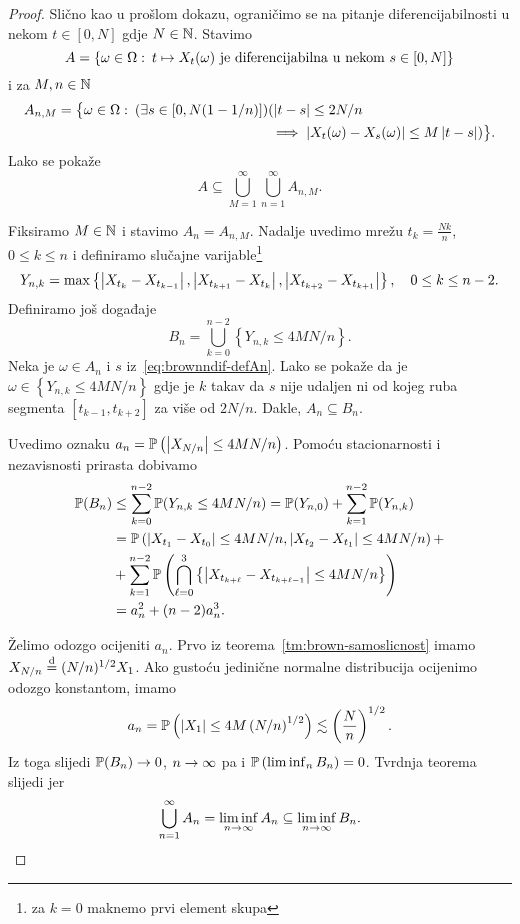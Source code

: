 \documentclass[main.tex]{subfiles}
\begin{document}
\begin{proof}
	Slično kao u prošlom dokazu, ograničimo se na pitanje diferencijabilnosti u nekom
	\( t \in \left[ 0, N \right] \) gdje \( N \in \N \). Stavimo
	\[ A = \left\{ \omega \in \Omega \st t \mapsto X_t(\omega)\mathrm{\ je \ diferencijabilna \ u\ nekom \  } s \in \left[ 0, N \right] \right\}  \]
	i za \( M, n \in \N \)
	\begin{equation} \label{eq:brownndif-defAn}
		\begin{aligned}
			A_{n, M} = \bigl\{ \omega \in \Omega \st (\exists s \in [ 0, N(1 - 1/n) ]) & (\abs{t-s} \le 2N/n \\  & \implies \abs{X_t(\omega) - X_s(\omega)} \le M\abs{t-s}) \bigr\}.
		\end{aligned}
	\end{equation}
	Lako se pokaže
	\[
		A \subseteq \bigcup_{M=1}^\infty \bigcup_{n=1}^\infty A_{n, M}.
	\]

	Fiksiramo \( M \in \N \) i stavimo \( A_n=A_{n,M} \). Nadalje uvedimo mrežu \( t_k = \frac{Nk}n \), \( 0\le k\le n \) i definiramo slučajne varijable\footnote{za \( k=0 \) maknemo prvi element skupa}
	\begin{equation}
		Y_{n, k} = \max \left\{ \abs{X_{t_k} - X_{t_{k-1}}}, \abs{X_{t_{k+1}}-X_{t_k}}, \abs{X_{t_{k+2}}- X_{t_{k+1}}}  \right\}, \quad 0 \le k \le n-2.
	\end{equation}
	Definiramo još događaje
	\begin{equation}
		B_n = \bigcup_{k=0}^{n-2} \left\{ Y_{n,k} \le 4MN/n \right\}.
	\end{equation}
	Neka je \( \omega \in A_n \) i \( s \) iz~\eqref{eq:brownndif-defAn}. Lako se pokaže da je \( \omega \in \left\{ Y_{n,k} \le 4MN/n \right\} \) gdje je \( k \) takav da \( s \) nije udaljen ni od kojeg ruba segmenta
	\( \left[ t_{k-1}, t_{k+2} \right] \) za više od \( 2N/n \). Dakle, \( A_n \subseteq B_n \).

	Uvedimo oznaku \( a_n = \P\left(\abs{X_{N/n}} \le 4MN/n \right) \). Pomoću stacionarnosti i nezavisnosti prirasta dobivamo
	\begin{align}
		\P(B_n) & \le \sum_{k=0}^{n-2} \P(Y_{n, k} \le 4MN/n) = \P(Y_{n, 0}) + \sum_{k=1}^{n-2} \P(Y_{n, k}) \\
		        & =  \P\left(\abs{X_{t_1}-X_{t_0}} \le 4MN/n, \abs{X_{t_2} - X_{t_1}} \le 4MN/n\right) +     \\&+
		\sum_{k=1}^{n-2} \P\left(\bigcap_{\ell=0}^3 \left\{ \abs{X_{t_{k+\ell}} - X_{t_{k+\ell-1}}} \le 4MN/n \right\} \right)
		\\ &= a_n^2 + (n-2)a_n^3.
	\end{align}

	Želimo odozgo ocijeniti \( a_n \). Prvo iz teorema~\ref{tm:brown-samoslicnost} imamo \( X_{N/n} \jpod (N/n)^{1/2} X_1 \). Ako gustoću jedinične normalne distribucija ocijenimo odozgo konstantom, imamo
	\[
		a_n = \P\left(\abs{X_1} \le 4M \left( N/n \right)  ^{1/2}\right) \lesssim \left( \frac Nn \right)^{1/2}.
	\]
	Iz toga slijedi \( \P(B_n) \un \), \( n \ub \) pa i \( \P\left( \liminf_n B_n \right) = 0 \). Tvrdnja teorema slijedi jer
	\[
		\bigcup_{n=1}^\infty A_n = \liminf_{n \ub} A_n \subseteq \liminf_{n \ub} B_n.
	\]
\end{proof}
\end{document}

